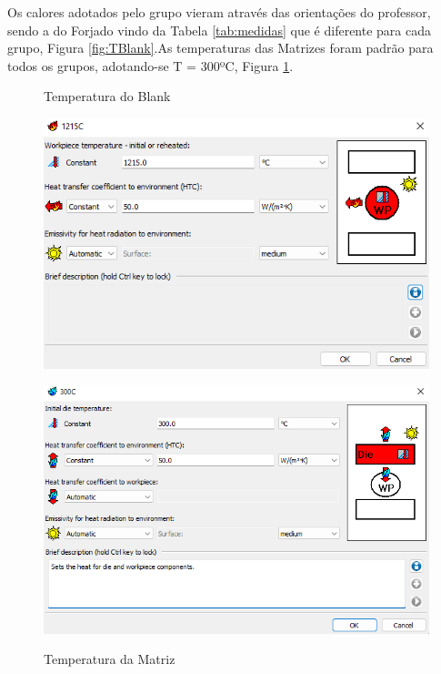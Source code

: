 \documentclass[deposito, acronym, symbols]{fei}
\begin{document}
Os calores adotados pelo grupo vieram através das orientações do professor, sendo a do Forjado vindo da Tabela \ref{tab:medidas} que é diferente para cada grupo, Figura \ref{fig:TBlank}.As temperaturas das Matrizes foram padrão para todos os grupos, adotando-se T = 300ºC, Figura \ref{fig:Tmatriz}.

\begin{figure}[!htp]
  \centering
  \begin{minipage}{0.4\textwidth}
    \centering
    \caption{Temperatura do Blank}
    \includegraphics[width=1\linewidth]{Imagens/Simufact - Temperatura do Black.png}
    \label{fig:TBlank}
  \end{minipage}
  \hfill
  \begin{minipage}{0.4\textwidth}
        \caption{Temperatura da Matriz}
    \includegraphics[width=1\linewidth]{Imagens/Simufact - Temperatura das Matrizes.png}
    \label{fig:Tmatriz}
  \end{minipage}
\end{figure}
\end{document}
